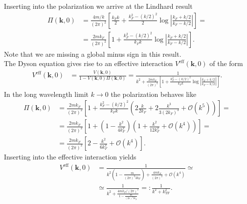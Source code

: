 \documentclass[english, parskip=full]{scrartcl}
\newcommand{\kla}{}
\newcommand{\klam}{}
\newcommand{\tecxt}{}
\begin{document}
Inserting into the polarization we arrive at the Lindhard result
\begin{align}
\Pi(\textbf{k},0) &= \frac{4m/k}{(2\pi)^2} \klam\left[ \frac{k_Fk}{2} + \frac{k_F^2 - (k/2)^2}{2} \log \left\vert \frac{k_F + k/2}{k_F - k/2} \right\vert \right] = \\
&= \frac{2mk_F}{(2\pi)^2} \klam\left[ 1 + \frac{k_F^2 - (k/2)^2}{k_Fk} \log \left\vert \frac{k_F + k/2}{k_F - k/2} \right\vert \right].
\end{align}
Note that we are missing a global minus sign in this result.\\
The Dyson equation gives rise to an effective interaction $V^\tecxt\text{eff}(\textbf{k}, 0)$ of the form
\begin{align}
V^\tecxt\text{eff}(\textbf{k}, 0) &= \frac{V(\textbf{k}, 0)}{1 - V(\textbf{k}, 0) \Pi(\textbf{k}, 0)} = \frac{1}{k^2 + \frac{2mk_F}{(2\pi)^2} \left[ 1 + \frac{k_F^2 - (k/2)^2}{k_Fk} \log \left\vert \frac{k_F + k/2}{k_F - k/2} \right\vert \right]}.
\end{align}
In the long wavelength limit $k\rightarrow 0$ the polarization behaves like
\begin{align}
\Pi(\textbf{k},0) &= \frac{2mk_F}{(2\pi)^2} \klam\left[ 1 + \frac{k_F^2 - (k/2)^2}{k_Fk} \kla\left( 2\frac{k}{2k_F} + 2\frac{k^3}{3(2k_F)^3} + \mathcal{O}(k^5) \right) \right] = \\
&= \frac{2mk_F}{(2\pi)^2} \klam\left[ 1 + \kla\left( 1 - \frac{k^2}{4k_F^2} \right) \kla\left( 1 + \frac{k^2}{12k_F^2} + \mathcal{O}(k^4) \right) \right] = \\
&= \frac{2mk_F}{(2\pi)^2} \klam\left[ 2 - \frac{k^2}{6k_F^2} + \mathcal{O}(k^4) \right].
\end{align}
Inserting into the effective interaction yields
\begin{align}
V^\tecxt\text{eff}(\textbf{k},0) &= \frac{1}{k^2 \kla\left( 1 - \frac{m}{(2\pi)^2 3k_F} \right) + \frac{4mk_F}{(2\pi)^2} + \mathcal{O}(k^4)} \simeq \\
&\simeq \frac{1}{k^2 + \frac{4mk_F / (2\pi)^2}{1 - \frac{m}{(2\pi)^2 3k_F}}} =: \frac{1}{k^2 + k_\text{TF}^2}.
\end{align}
\end{document}
